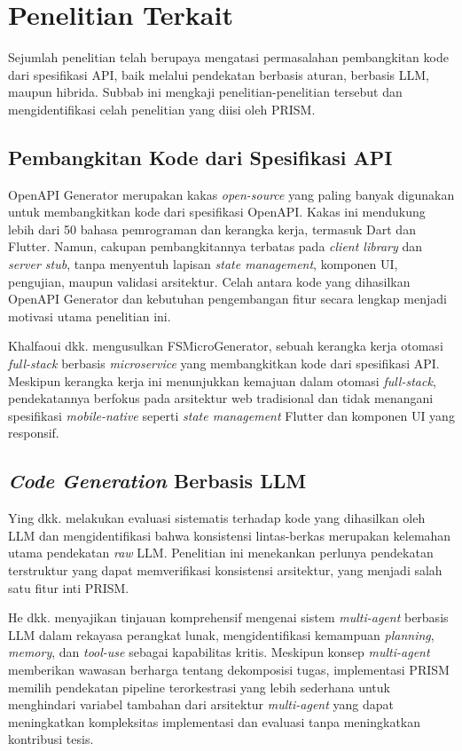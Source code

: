 \section{Penelitian Terkait}

Sejumlah penelitian telah berupaya mengatasi permasalahan pembangkitan kode dari spesifikasi API, baik melalui pendekatan berbasis aturan, berbasis LLM, maupun hibrida. Subbab ini mengkaji penelitian-penelitian tersebut dan mengidentifikasi celah penelitian yang diisi oleh PRISM.

\subsection{Pembangkitan Kode dari Spesifikasi API}

OpenAPI Generator \cite{openapitools2026} merupakan kakas \textit{open-source} yang paling banyak digunakan untuk membangkitkan kode dari spesifikasi OpenAPI. Kakas ini mendukung lebih dari 50 bahasa pemrograman dan kerangka kerja, termasuk Dart dan Flutter. Namun, cakupan pembangkitannya terbatas pada \textit{client library} dan \textit{server stub}, tanpa menyentuh lapisan \textit{state management}, komponen UI, pengujian, maupun validasi arsitektur. Celah antara kode yang dihasilkan OpenAPI Generator dan kebutuhan pengembangan fitur secara lengkap menjadi motivasi utama penelitian ini.

Khalfaoui dkk. \cite{khalfaoui2025} mengusulkan FSMicroGenerator, sebuah kerangka kerja otomasi \textit{full-stack} berbasis \textit{microservice} yang membangkitkan kode dari spesifikasi API. Meskipun kerangka kerja ini menunjukkan kemajuan dalam otomasi \textit{full-stack}, pendekatannya berfokus pada arsitektur web tradisional dan tidak menangani spesifikasi \textit{mobile-native} seperti \textit{state management} Flutter dan komponen UI yang responsif.

\subsection{\textit{Code Generation} Berbasis LLM}

Ying dkk. \cite{ying2025} melakukan evaluasi sistematis terhadap kode yang dihasilkan oleh LLM dan mengidentifikasi bahwa konsistensi lintas-berkas merupakan kelemahan utama pendekatan \textit{raw} LLM. Penelitian ini menekankan perlunya pendekatan terstruktur yang dapat memverifikasi konsistensi arsitektur, yang menjadi salah satu fitur inti PRISM.

He dkk. \cite{he2025} menyajikan tinjauan komprehensif mengenai sistem \textit{multi-agent} berbasis LLM dalam rekayasa perangkat lunak, mengidentifikasi kemampuan \textit{planning}, \textit{memory}, dan \textit{tool-use} sebagai kapabilitas kritis. Meskipun konsep \textit{multi-agent} memberikan wawasan berharga tentang dekomposisi tugas, implementasi PRISM memilih pendekatan pipeline terorkestrasi yang lebih sederhana untuk menghindari variabel tambahan dari arsitektur \textit{multi-agent} yang dapat meningkatkan kompleksitas implementasi dan evaluasi tanpa meningkatkan kontribusi tesis.

